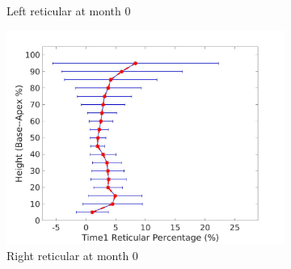 \begin{figure}[H]
\begin{subfigure}{.42\linewidth}
  \caption{Left reticular at month 0}
  \label{fig:DiseaseAgainstHeightTime1-c} 
\end{subfigure} 
\begin{subfigure}{.42\linewidth}%
  \includegraphics[width=\linewidth,trim={{.0\wd0} {.0\wd0} {.0\wd0} {.0\wd0}},clip]{QuantitativeAnalysis/Image/RightLungReticularDiseaseAgainstHeightTime1.jpg}
  \caption{Right reticular at month 0}
  \label{fig:DiseaseAgainstHeightTime1-d}
\end{subfigure}
\begin{subfigure}{.42\linewidth}%

\end{subfigure}
\end{figure}
